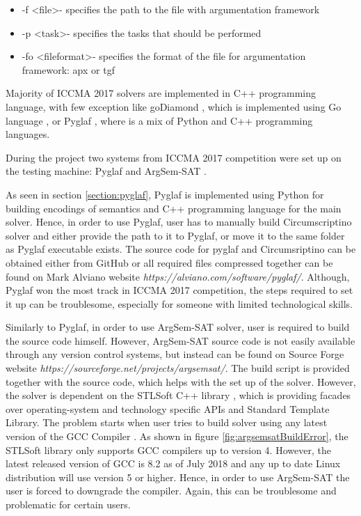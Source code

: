 \begin{itemize}
	\item -f \textless file\textgreater - specifies the path to the file with argumentation framework
	\item -p \textless task\textgreater - specifies the tasks that should be performed
	\item -fo \textless fileformat\textgreater - specifies the format of the file for argumentation framework: apx or tgf
\end{itemize}

Majority of ICCMA 2017 solvers are implemented in C++ programming language, with few exception like goDiamond \citep{goDiamond}, which is implemented using Go language \citep{GoLang}, or Pyglaf \citep{pyglaf}, where is a mix of Python and C++ programming languages. 

During the project two systems from ICCMA 2017 competition were set up on the testing machine: Pyglaf \citep{pyglaf} and ArgSem-SAT \citep{argsemsat}. 

As seen in section \ref{section:pyglaf}, Pyglaf is implemented using Python for building encodings of semantics and C++ programming language for the main solver. Hence, in order to use Pyglaf, user has to manually build Circumscriptino \citep{circumscriptino} solver and either provide the path to it to Pyglaf, or move it to the same folder as Pyglaf executable exists. The source code for pyglaf and Circumsriptino can be obtained either from GitHub or all required files compressed together can be found on Mark Alviano website \textit{https://alviano.com/software/pyglaf/}. Although, Pyglaf won the most track in ICCMA 2017 competition, the steps required to set it up can be troublesome, especially for someone with limited technological skills. 

Similarly to Pyglaf, in order to use ArgSem-SAT solver, user is required to build the source code himself. However, ArgSem-SAT source code is not easily available through any version control systems, but instead can be found on Source Forge website \textit{https://sourceforge.net/projects/argsemsat/}. The build script is provided together with the source code, which helps with the set up of the solver. However, the solver is dependent on the STLSoft C++ library \citep{stlsoft}, which is providing facades over operating-system and technology specific APIs and Standard Template Library. The problem starts when user tries to build solver using any latest version of the GCC Compiler \citep{gcc}. As shown in figure \ref{fig:argsemsatBuildError}, the STLSoft library only supports GCC compilers up to version 4. However, the latest released version of GCC is 8.2 as of July 2018 \citep{gcc} and any up to date Linux distribution will use version 5 or higher. Hence, in order to use ArgSem-SAT the user is forced to downgrade the compiler. Again, this can be troublesome and problematic for certain users.

